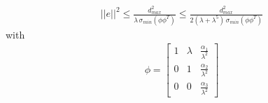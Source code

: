 \documentclass[10pt,a4paper]{amsart}
\begin{document}
\begin{theorem}
\begin{equation}
  \begin{split}
||e||^2 \leq \frac{d_{max}^2}{\lambda\,\sigma_{min}(\phi \phi^T)}\leq\frac{d_{max}^2}{2 \left(\lambda+\lambda^{5}\right)\,\sigma_{min}(\phi \phi^T)}
\end{split}
\end{equation}
with
\begin{equation} \label{phi2}
  \begin{split}
\phi = \left[ \begin{array}{lll} 1&\lambda&\frac{\alpha_1}{\lambda^2}\\ 0 & 1 & \frac{\alpha_2}{\lambda^2}\\ 0& 0&\frac{\alpha_3}{\lambda^2} \end{array}\right]
\end{split}
\end{equation}
\end{theorem}
\end{document}
